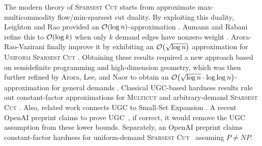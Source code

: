The modern theory of \textsc{Sparsest Cut} starts from approximate max-multicommodity flow/min-sparsest cut duality. By exploiting this duality, Leighton and Rao provided an $\mathcal{O}\mathopen{}\left( \log n \right)$-approximation \cite{MulticommodityMaxFlowMinCutTheoremsAndTheirUseInDesigningApproximationAlgorithms}. Aumann and Rabani refine this to $\mathcal{O}\mathopen{}\left( \log k \right)$ when only $k$ demand edges have nonzero weight \cite{AnOlogkApproximateMinCutMaxFlowTheoremAndApproximationAlgorithm}. Arora-Rao-Vazirani finally improve it by exhibiting an $\mathcal{O}\mathopen{}\left( \sqrt{\log n} \right)$ approximation for \textsc{Uniform Sparsest Cut} \cite{ExpanderFlowsGeometricEmbeddingsAndGraphPartitioning}. Obtaining these results required a new approach based on semidefinite programming and high-dimension geometry, which was then further refined by Arora, Lee, and Naor to obtain an $\mathcal{O}\mathopen{}\left( \sqrt{\log n}\cdot \log\log n \right)$-approximation for general demands \cite{EuclideanDistortionAndTheSparsestCut}. Classical UGC-based hardness results rule out constant-factor approximations for \textsc{Multicut} and arbitrary-demand \textsc{Sparsest Cut} \cite{OnTheHardnessOfApproximatingMulticutAndSparsestCut,TheUniqueGamesConjectureIntegralityGapForCutProblemsAndEmbeddabilityOfNegativeTypeMetricsIntoL1}. Also, related work connects UGC to Small-Set Expansion \cite{OnTheHardnessOfApproximatingMulticutAndSparsestCut,TheUniqueGamesConjectureIntegralityGapForCutProblemsAndEmbeddabilityOfNegativeTypeMetricsIntoL1,GraphExpansionAndTheUniqueGamesConjecture}. A recent OpenAI preprint claims to prove UGC~\cite{OAI:The-Unique-Games-Theorem-September-23-2026}, if correct, it would remove the UGC assumption from these lower bounds. Separately, an OpenAI preprint claims constant-factor hardness for uniform-demand \textsc{Sparsest Cut}~\cite{OAI:Constant-factor-hardness-of-uniform-sparsest-cut-September-24-2026} assuming $P\neq NP$.

